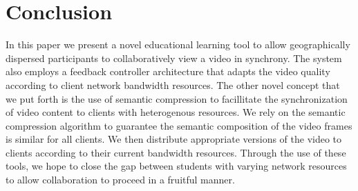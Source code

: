 \documentclass{sig-alternate}
\begin{document}
%

\section{Conclusion}

In this paper we present a novel educational learning tool to allow
geographically dispersed participants to collaboratively view a video
in synchrony.  The system also employs a feedback controller
architecture that adapts the video quality according to client network
bandwidth resources.  The other novel concept that we put forth is the
use of semantic compression to facillitate the synchronization of
video content to clients with heterogenous resources.  We rely on the
semantic compression algorithm to guarantee the semantic composition
of the video frames is similar for all clients.  We then distribute
appropriate versions of the video to clients according to their
current bandwidth resources.  Through the use of these tools, we hope
to close the gap between students with varying network resources to
allow collaboration to proceed in a fruitful manner.




\end{document}
